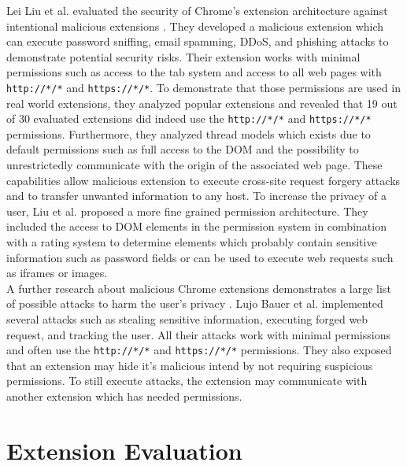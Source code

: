 	Lei Liu et al. evaluated the security of Chrome's extension architecture against intentional malicious extensions \cite{Liu12chromeextensions:}. They developed a malicious extension which can execute password sniffing, email spamming, DDoS, and phishing attacks to demonstrate potential security risks. Their extension works with minimal permissions such as access to the tab system and access to all web pages with \texttt{http://*/*} and \texttt{https://*/*}. To demonstrate that those permissions are used in real world extensions, they analyzed popular extensions and revealed that 19 out of 30 evaluated extensions did indeed use the \texttt{http://*/*} and \texttt{https://*/*} permissions. Furthermore, they analyzed thread models which exists due to default permissions such as full access to the DOM and the possibility to unrestrictedly communicate with the origin of the associated web page. These capabilities allow malicious extension to execute cross-site request forgery attacks and to transfer unwanted information to any host. To increase the privacy of a user, Liu et al. proposed a more fine grained permission architecture. They included the access to DOM elements in the permission system in combination with a rating system to determine elements which probably contain sensitive information such as password fields or can be used to execute web requests such as iframes or images. \\
	
	A further research about malicious Chrome extensions demonstrates a large list of possible attacks to harm the user's privacy \cite{extensions:cns14}. Lujo Bauer et al. implemented several attacks such as stealing sensitive information, executing forged web request, and tracking the user. All their attacks work with minimal permissions and often use the \texttt{http://*/*} and \texttt{https://*/*} permissions. They also exposed that an extension may hide it's malicious intend by not requiring suspicious permissions. To still execute attacks, the extension may communicate with another extension which has needed permissions. \\
	
	
	
\section{Extension Evaluation} 
	

